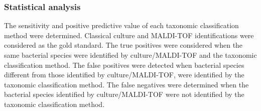\subsubsection{Statistical analysis}

The sensitivity and positive predictive value of each taxonomic classification method were determined. 
Classical culture and MALDI-TOF identifications were considered as the gold standard. 
The true positives were considered when the same bacterial species were identified by culture/MALDI-TOF and the taxonomic classification method. 
The false positives were detected when bacterial species different from those identified by culture/MALDI-TOF, were identified by the taxonomic classification method. 
The false negatives were determined when the bacterial species identified by culture/MALDI-TOF were not identified by the taxonomic classification method.